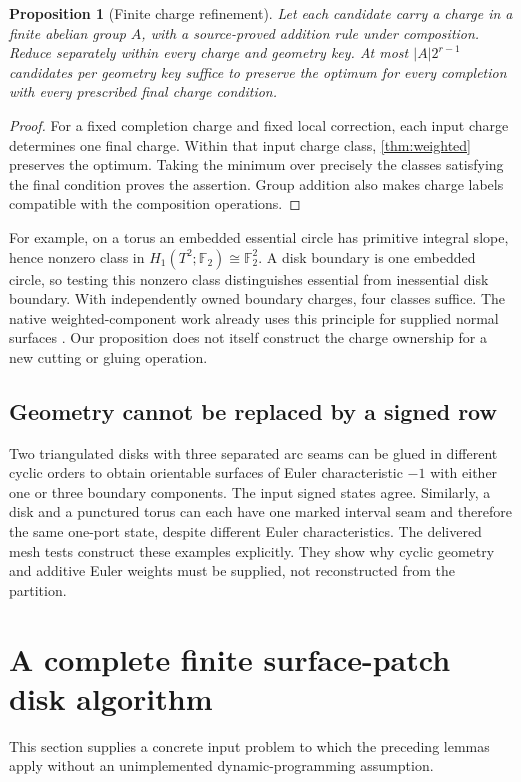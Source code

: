 \documentclass[11pt,letterpaper]{article}
\newtheorem{proposition}[theorem]{Proposition}
\theoremstyle{definition}
\newcommand{\F}{\mathbb F}
\begin{document}
\begin{proposition}[Finite charge refinement]\label{prop:charges}
Let each candidate carry a charge in a finite abelian group $A$, with a source-proved addition rule under composition. Reduce separately within every charge and geometry key. At most $|A|2^{r-1}$ candidates per geometry key suffice to preserve the optimum for every completion with every prescribed final charge condition.
\end{proposition}
\begin{proof}
For a fixed completion charge and fixed local correction, each input charge determines one final charge. Within that input charge class, \cref{thm:weighted} preserves the optimum. Taking the minimum over precisely the classes satisfying the final condition proves the assertion. Group addition also makes charge labels compatible with the composition operations.
\end{proof}
For example, on a torus an embedded essential circle has primitive integral slope, hence nonzero class in $H_1(T^2;\F_2)\cong\F_2^2$. A disk boundary is one embedded circle, so testing this nonzero class distinguishes essential from inessential disk boundary. With independently owned boundary charges, four classes suffice. The native weighted-component work already uses this principle for supplied normal surfaces \cite{native}. Our proposition does not itself construct the charge ownership for a new cutting or gluing operation.

\subsection{Geometry cannot be replaced by a signed row}
Two triangulated disks with three separated arc seams can be glued in different cyclic orders to obtain orientable surfaces of Euler characteristic $-1$ with either one or three boundary components. The input signed states agree. Similarly, a disk and a punctured torus can each have one marked interval seam and therefore the same one-port state, despite different Euler characteristics. The delivered mesh tests construct these examples explicitly. They show why cyclic geometry and additive Euler weights must be supplied, not reconstructed from the partition.

\section{A complete finite surface-patch disk algorithm}
\label{sec:patch}
This section supplies a concrete input problem to which the preceding lemmas apply without an unimplemented dynamic-programming assumption.
\end{document}

